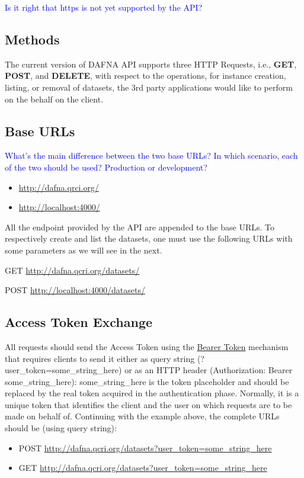 \documentclass[a4paper,10pt]{scrartcl}
\newcommand{\lamine}[1]{\textcolor{blue}{#1}}
\begin{document}
\lamine{Is it right that https is not yet supported by the API?}
\subsection{Methods}
The current version of DAFNA API supports three HTTP Requests, i.e., \textbf{GET}, \textbf{POST}, and \textbf{DELETE}, 
with respect to the operations, for instance creation, listing, or removal of datasets, the 3rd party applications would
like to perform on the behalf on the client.
\subsection{Base URLs}
\lamine{What's the main difference between the two base URLs? In which scenario, each of the two should be used? Production or development?}
\begin{itemize}
 \item \href{http://dafna.qrci.org/}{http://dafna.qrci.org/}
 \item \href{http://localhost:4000/}{http://localhost:4000/}
\end{itemize}
All the endpoint provided by the API are appended to the base URLs.
To respectively create and list the datasets, one must use the following URLs with some parameters
as we will see in the next. 
\begin{description}
\item GET \href{http://dafna.qcri.org/datasets/}{http://dafna.qcri.org/datasets/} \\
 \item POST \href{http://localhost:4000/datasets/}{http://localhost:4000/datasets/}
\end{description}

\subsection{Access Token Exchange}
All requests should send the Access Token using the \href{http://oauth2.thephpleague.com/token-types/}{Bearer Token}
mechanism that requires clients to send it either as query string (?user\_token=some\_string\_here)
or as an HTTP header (Authorization: Bearer some\_string\_here): some\_string\_here is the
token placeholder and should be replaced by the real token acquired in the authentication phase.
Normally, it is a unique token that identifies the client and the user on which
requests are to be made on behalf of. Continuing with the example above, the complete
URLs should be (using query string): 
\begin{itemize}
 \item POST \href{http://localhost:4000/datasets?user\_token=some\_string\_here}{http://dafna.qcri.org/datasets?user\_token=some\_string\_here} \\
  \item GET \href{http://dafna.qcri.org/datasets?user\_token=some\_string\_here}{http://dafna.qcri.org/datasets?user\_token=some\_string\_here} 
\end{itemize}
\end{document}
